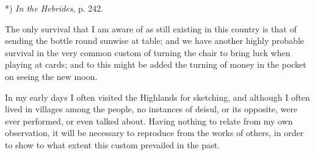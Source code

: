 \documentclass[a4paper, 11pt, oneside, polutonikogreek, english]{article}
\begin{document}
*) \emph{In the Hebrides}, p. 242.

The only survival that I am aware of as still existing in this country is that of sending the bottle round sunwise at table; and we have another highly probable survival in the very common custom of turning the chair to bring luck when playing at cards; and to this might be added the turning of money in the pocket on seeing the new moon.

In my early days I often visited the Highlands for sketching, and although I often lived in villages among the people, no instances of deisul, or its opposite, were ever performed, or even talked about. Having nothing to relate from my own observation, it will be necessary to reproduce from the works of others, in order to show to what extent this custom prevailed in the past.
\end{document}
